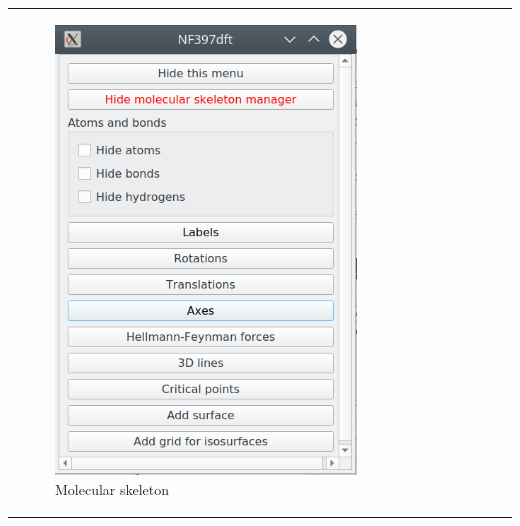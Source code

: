 \documentclass[10pt]{article}
\begin{document}
\begin{tabular}{lcr}
\begin{minipage}{.3\linewidth}
    \begin{figure}[H]
        \begin{center}
            \includegraphics[width=0.8\linewidth]{damqt320_molecular_skeleton.png}
        \end{center}
        \vspace*{17mm}
        \caption{Molecular skeleton \label{fig:4_13_1_1}}
    \end{figure}
\end{minipage}
&
\begin{minipage}{.3\linewidth}
    \begin{figure}[H]
        \begin{center}
            \vspace*{0mm}

\end{center}
\end{figure}
\end{minipage}
\end{tabular}
\end{document}
